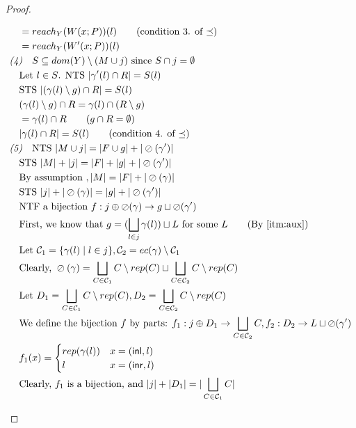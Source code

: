 \documentclass{easychair}
\newcommand{\ms}[1]{\ensuremath{\mathsf{#1}}}
\newcommand{\oh}[1]{\oslash(#1)}
\theoremstyle{definition}
\begin{document}
\begin{proof}
\begin{description}
\begin{align*}
		&\quad = reach_{Y}(W(x;P))(l) \tag{condition 3. of $\preceq$}\\
		&\quad = reach_{Y}(W'(x;P))(l) \\
		&\emph{(4)}\quad S \subseteq dom(Y) \setminus (M \cup j) \text{ since } S \cap j = \emptyset\\
		&\quad \text{Let } l \in S \text{. NTS } |\gamma'(l) \cap R| = S(l)\\
		&\quad \text{STS } |(\gamma(l)\setminus g) \cap R| = S(l)\\
		&\quad (\gamma(l)\setminus g) \cap R = \gamma(l) \cap (R \setminus g)\\
		&\quad = \gamma(l) \cap R \tag{$g \cap R = \emptyset$}\\
		&\quad |\gamma(l) \cap R| = S(l) \tag{condition 4. of $\preceq$}\\
		&\emph{(5)}\quad \text{NTS } |M \cup j| = |F \cup g| + |\oh{\gamma'}|\\
		&\quad \text{STS } |M| + |j| = |F| + | g| + |\oh{\gamma'}|\\
		&\quad \text{By assumption }, |M| = |F| + |\oh{\gamma}|\\
		&\quad \text{STS } |j| + |\oh{\gamma}| = |g| + |\oh{\gamma'}|\\
		&\quad \text{NTF a bijection } f : j \oplus \oh{\gamma} \to g \sqcup \oh{\gamma'}\\
		&\quad \text{First, we know that } g = (\bigsqcup_{l \in j} \gamma(l)) \sqcup L 
			\text{ for some } L \tag{By \ref{itm:aux}}\\
		&\quad \text{Let } \mathcal{C}_1 = \{\gamma(l) \mid l \in j\},
				\mathcal{C}_2 = ec(\gamma) \setminus \mathcal{C}_1\\
		&\quad \text{Clearly, } \oh{\gamma} = 
		\bigsqcup_{C  \in \mathcal{C}_1} C \setminus rep(C) \sqcup \bigsqcup_{C  \in \mathcal{C}_2} C \setminus rep(C)\\
		&\quad \text{Let } D_1 = \bigsqcup_{C  \in \mathcal{C}_1} C \setminus rep(C), 
		D_2 = \bigsqcup_{C  \in \mathcal{C}_2} C \setminus rep(C)\\
		&\quad \text{We define the bijection } 
			f \text{ by parts: } 
			f_1 : j \oplus D_1 \to \bigsqcup_{C \in \mathcal{C}_2} C, f_2 : D_2 \to L \sqcup \oh{\gamma'}\\
		&\quad f_1(x) =  
		\begin{cases}
			rep(\gamma(l)) &x = (\ms{inl},l)\\
			l &x = (\ms{inr},l)
		\end{cases}\\
		&\quad \text{Clearly, } f_1 \text{ is a bijection, and } |j| + |D_1| = |\bigsqcup_{C \in \mathcal{C}_1} C|\\

\end{align*}
\end{description}
\end{proof}
\end{document}
